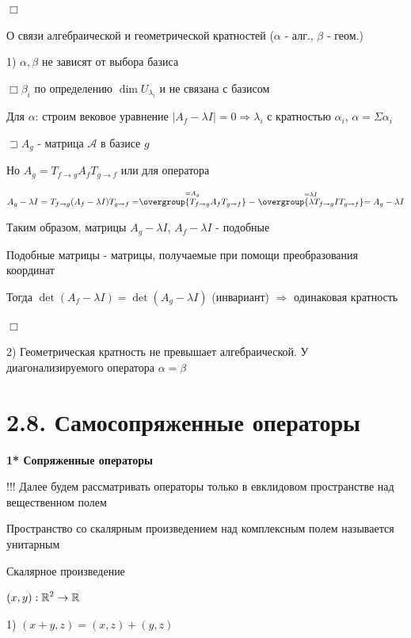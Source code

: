 \documentclass[12pt]{article}
\begin{document}
    $\Box$

    \Nota О связи алгебраической и геометрической кратностей ($\alpha$ - алг., $\beta$ - геом.)

    1) $\alpha, \beta$ не зависят от выбора базиса

    $\displaystyle \Box \beta_i$ по определению $\displaystyle \dim U_{\lambda_i}$ и не связана с базисом

    Для $\alpha$: строим вековое уравнение $\displaystyle |A_f - \lambda I| = 0 \Longrightarrow \lambda_i$ с кратностью $\displaystyle \alpha_i$, $\displaystyle \alpha = \Sigma \alpha_i$

    $\displaystyle \sqsupset A_g$ - матрица $\mathcal{A}$ в базисе $g$

    Но $\displaystyle A_g = T_{f\to g} A_f T_{g\to f}$ или для оператора

    $\displaystyle A_g - \lambda I = T_{f\to g} (A_f - \lambda I) T_{g\to f} =
    \stackrel{= A_g}{\overgroup{T_{f\to g} A_f T_{g\to f}}} - \stackrel{= \lambda I}{\overgroup{\lambda T_{f\to g} I T_{g\to f}}} =
    A_g - \lambda I$

    Таким образом, матрицы $\displaystyle A_g - \lambda I$, $\displaystyle A_f - \lambda I$ - подобные

    \Def Подобные матрицы - матрицы, получаемые при помощи преобразования координат

    Тогда $\displaystyle \det (A_f - \lambda I) = \det (A_g - \lambda I)$ (инвариант) $\Longrightarrow$ одинаковая кратность

    $\Box$

    2) Геометрическая кратность не превышает алгебраической. У диагонализируемого оператора $\alpha = \beta$

    \section{2.8. Самосопряженные операторы}

    \textbf{1* Сопряженные операторы}

    !!! Далее будем рассматривать операторы только в евклидовом пространстве над вещественном полем

    Пространство со скалярным произведением над комплексным полем называется унитарным

    \Mem Скалярное произведение

    $\displaystyle (x, y) : \mathbb{R}^2 \rightarrow \mathbb{R}$

    1) $(x + y, z) = (x, z) + (y, z)$
\end{document}

